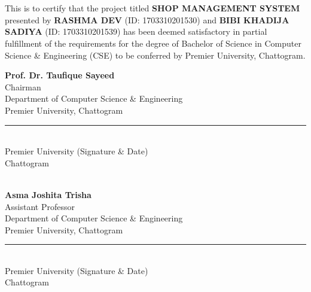 \section*{}
\vspace{1cm}

This is to certify that the project titled \textbf{SHOP MANAGEMENT SYSTEM} presented by \textbf{RASHMA DEV} (ID: 1703310201530) and \textbf{BIBI KHADIJA SADIYA} (ID: 1703310201539) has been deemed satisfactory in partial fulfillment of the requirements for the degree of Bachelor of Science in Computer Science \& Engineering (CSE) to be conferred by Premier University, Chattogram.

\vspace{2cm}

\begin{flushleft}
\textbf{Prof. Dr. Taufique Sayeed} \\
Chairman \\
Department of Computer Science \& Engineering\\
Premier University, Chattogram\\[12ex]
\rule{7cm}{0.4pt} \\
Premier University (Signature \& Date)\\
Chattogram
\end{flushleft}


\vspace{1cm}
\begin{flushleft}
[Supervisor] \\
\textbf{Asma Joshita Trisha} \\
Assistant Professor \\
Department of Computer Science \& Engineering\\
Premier University, Chattogram\\[12ex]
\rule{7cm}{0.4pt} \\
Premier University (Signature \& Date)\\
Chattogram
\end{flushleft}




